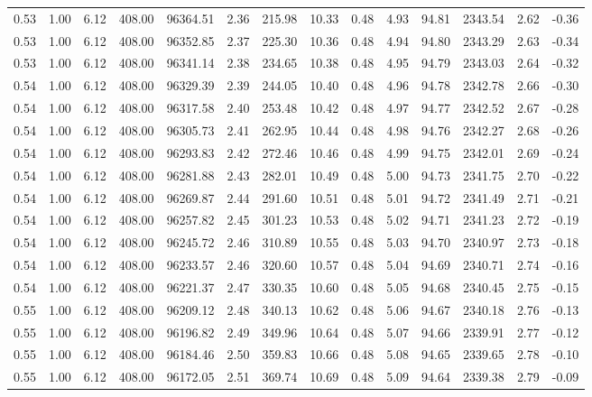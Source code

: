 \begin{table}[!ht]
\begin{tabular}{rrrrrrrrrrrrrr}
0.53 & 1.00 & 6.12 & 408.00 & 96364.51 & 2.36 & 215.98 & 10.33 & 0.48 & 4.93 & 94.81 & 2343.54 & 2.62 & -0.36 \\
0.53 & 1.00 & 6.12 & 408.00 & 96352.85 & 2.37 & 225.30 & 10.36 & 0.48 & 4.94 & 94.80 & 2343.29 & 2.63 & -0.34 \\
0.53 & 1.00 & 6.12 & 408.00 & 96341.14 & 2.38 & 234.65 & 10.38 & 0.48 & 4.95 & 94.79 & 2343.03 & 2.64 & -0.32 \\
0.54 & 1.00 & 6.12 & 408.00 & 96329.39 & 2.39 & 244.05 & 10.40 & 0.48 & 4.96 & 94.78 & 2342.78 & 2.66 & -0.30 \\
0.54 & 1.00 & 6.12 & 408.00 & 96317.58 & 2.40 & 253.48 & 10.42 & 0.48 & 4.97 & 94.77 & 2342.52 & 2.67 & -0.28 \\
0.54 & 1.00 & 6.12 & 408.00 & 96305.73 & 2.41 & 262.95 & 10.44 & 0.48 & 4.98 & 94.76 & 2342.27 & 2.68 & -0.26 \\
0.54 & 1.00 & 6.12 & 408.00 & 96293.83 & 2.42 & 272.46 & 10.46 & 0.48 & 4.99 & 94.75 & 2342.01 & 2.69 & -0.24 \\
0.54 & 1.00 & 6.12 & 408.00 & 96281.88 & 2.43 & 282.01 & 10.49 & 0.48 & 5.00 & 94.73 & 2341.75 & 2.70 & -0.22 \\
0.54 & 1.00 & 6.12 & 408.00 & 96269.87 & 2.44 & 291.60 & 10.51 & 0.48 & 5.01 & 94.72 & 2341.49 & 2.71 & -0.21 \\
0.54 & 1.00 & 6.12 & 408.00 & 96257.82 & 2.45 & 301.23 & 10.53 & 0.48 & 5.02 & 94.71 & 2341.23 & 2.72 & -0.19 \\
0.54 & 1.00 & 6.12 & 408.00 & 96245.72 & 2.46 & 310.89 & 10.55 & 0.48 & 5.03 & 94.70 & 2340.97 & 2.73 & -0.18 \\
0.54 & 1.00 & 6.12 & 408.00 & 96233.57 & 2.46 & 320.60 & 10.57 & 0.48 & 5.04 & 94.69 & 2340.71 & 2.74 & -0.16 \\
0.54 & 1.00 & 6.12 & 408.00 & 96221.37 & 2.47 & 330.35 & 10.60 & 0.48 & 5.05 & 94.68 & 2340.45 & 2.75 & -0.15 \\
0.55 & 1.00 & 6.12 & 408.00 & 96209.12 & 2.48 & 340.13 & 10.62 & 0.48 & 5.06 & 94.67 & 2340.18 & 2.76 & -0.13 \\
0.55 & 1.00 & 6.12 & 408.00 & 96196.82 & 2.49 & 349.96 & 10.64 & 0.48 & 5.07 & 94.66 & 2339.91 & 2.77 & -0.12 \\
0.55 & 1.00 & 6.12 & 408.00 & 96184.46 & 2.50 & 359.83 & 10.66 & 0.48 & 5.08 & 94.65 & 2339.65 & 2.78 & -0.10 \\
0.55 & 1.00 & 6.12 & 408.00 & 96172.05 & 2.51 & 369.74 & 10.69 & 0.48 & 5.09 & 94.64 & 2339.38 & 2.79 & -0.09 \\

\end{tabular}
\end{table}
